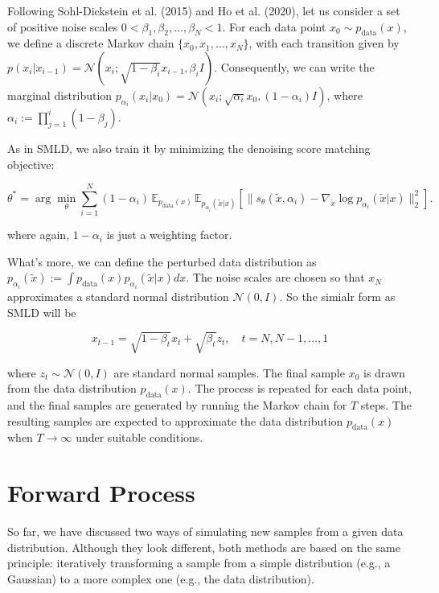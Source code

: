Following Sohl-Dickstein et al. (2015) and Ho et al. (2020), let us consider a set of positive noise scales \( 0 < \beta_1, \beta_2, \dots, \beta_N < 1 \). For each data point \( x_0 \sim p_{\text{data}}(x) \), we define a discrete Markov chain \( \{x_0, x_1, \dots, x_N\} \), with each transition given by \( p(x_i | x_{i-1}) = \mathcal{N} \left( x_i ; \sqrt{1 - \beta_i} x_{i-1}, \beta_i I \right) \). Consequently, we can write the marginal distribution \( p_{\alpha_i}(x_i | x_0) = \mathcal{N} \left( x_i ; \sqrt{\alpha_i} x_0, (1 - \alpha_i) I \right) \), where \( \alpha_i := \prod_{j=1}^i (1 - \beta_j) \).

As in SMLD, we also train it by minimizing the denoising score matching objective:

\begin{equation}
\theta^* = \arg \min_{\theta} \sum_{i=1}^{N} (1-\alpha_i) \, \mathbb{E}_{p_{\text{data}}(x)} \, \mathbb{E}_{p_{\alpha_i}(\tilde{x} | x)} \left[ \| s_\theta(\tilde{x}, \alpha_i) - \nabla_{\tilde{x}} \log p_{\alpha_i}(\tilde{x} | x) \|_2^2 \right].
\end{equation}

where again, $1-\alpha_i$ is just a weighting factor.

What's more, we can define the perturbed data distribution as \( p_{\alpha_i}(\tilde{x}) := \int p_{\text{data}}(x) p_{\alpha_i}(\tilde{x} | x) dx \). The noise scales are chosen so that \( x_N \) approximates a standard normal distribution \( \mathcal{N}(0, I) \). So the simialr form as SMLD will be 

\begin{equation}
    x_{t-1} = \sqrt{1 - \beta_t} x_t + \sqrt{\beta_t} z_t, \quad t = N, N-1, \dots, 1  
\end{equation}

where \( z_t \sim \mathcal{N}(0, I) \) are standard normal samples. The final sample \( x_0 \) is drawn from the data distribution \( p_{\text{data}}(x) \). The process is repeated for each data point, and the final samples are generated by running the Markov chain for \( T \) steps. The resulting samples are expected to approximate the data distribution \( p_{\text{data}}(x) \) when \( T \to \infty \) under suitable conditions.
\section{Forward Process}
So far, we have discussed two ways of simulating new samples from a given data distribution. Although they look different, both methods are based on the same principle: iteratively transforming a sample from a simple distribution (e.g., a Gaussian) to a more complex one (e.g., the data distribution). 

